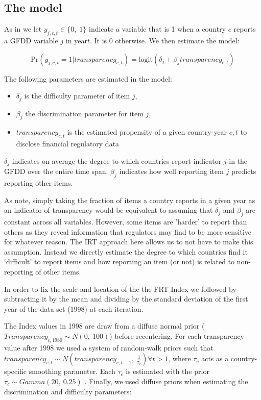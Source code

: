 \documentclass[a4paper]{article}
\begin{document}
\subsection{The model}

As in \cite{Hollyer2014} we let $y_{j,c,t} \in \{0,\; 1\}$ indicate a variable that is 1 when a country $c$ reports a GFDD variable $j$ in year$t$. It is 0 otherwise. We then estimate the model:

\begin{equation}
    \mathrm{Pr}(y_{j,c,t} = 1|transparency_{c,t}) = \mathrm{logit}(\delta_{j} + \beta_{j}transparency_{c,t})
\end{equation}

The following parameters are estimated in the model:

\begin{itemize}
    \item $\delta_{j}$ is the difficulty parameter of item $j$,
    \item $\beta_{j}$ the discrimination parameter for item $j$,
    \item $transparency_{c,t}$ is the estimated propensity of a given country-year $c,t$ to disclose financial regulatory data
\end{itemize}

\noindent $\delta_{j}$ indicates on average the degree to which countries report indicator $j$ in the GFDD over the entire time span. $\beta_{j}$ indicates how well reporting item $j$ predicts reporting other items. 

As \cite{Hollyer2014} note, simply taking the fraction of items a country reports in a given year as an indicator of transparency would be equivalent to assuming that $\delta_{j}$ and $\beta_{j}$ are constant across all variables. However, some items are 'harder' to report than others as they reveal information that regulators may find to be more sensitive for whatever reason. The IRT approach here allows us to not have to make this assumption. Instead we directly estimate the degree to which countries find it `difficult' to report items and how reporting an item (or not) is related to non-reporting of other items.

In order to fix the scale and location of the the FRT Index we followed \cite{Hollyer2014} by subtracting it by the mean and dividing by the standard deviation of the first year of the data set (1998) at each iteration. 

The Index values in 1998 are draw from a diffuse normal prior ($Transparency_{c,1980} \sim N(0,\:100)$) before recentering. For each transparency value after 1998 we used a system of random-walk priors such that $transparency_{c,t} \sim N(transparency_{c,t-1},\: \frac{1}{\tau_{c}}) \forall t > 1$, where $\tau_{c}$ acts as a country-specific smoothing parameter. Each $\tau_{c}$ is estimated with the prior $\tau_{c} \sim Gamma(20,\:0.25)$ \citep[for more details see][8]{Jackman2009,Hollyer2014}. Finally, we used diffuse priors when estimating the discrimination and difficulty parameters:
\end{document}
